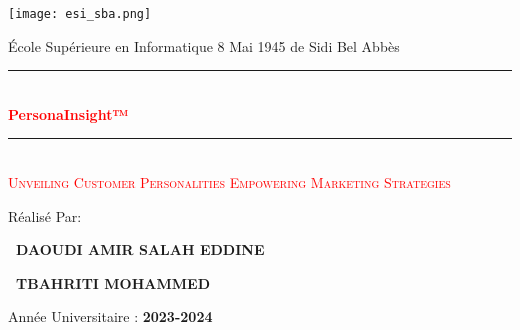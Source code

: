 \documentclass[12pt,a4paper]{report}
\begin{document}
\begin{titlepage}
\vspace{-5cm } 
\begin{center}

{\texttt{[image: esi\_sba.png]}}
\end{center}
\begin{center}


\vspace{1cm}
\medskip
{\Large{École Supérieure en Informatique 8 Mai 1945 de Sidi Bel Abbès}}\\
 \vskip3cm
 \noindent {\textsc{\LARGE \textcolor{blue}{ STUDY OF CLUSTERING ALGORITHMS BY \vskip0.5cm   
ANALYSING CUSTOMERS PERSONALITY }}\\[2cm]}
\end{center}
\vskip0.5cm
\begin{center}
\vskip0.5cm
\newcommand{\HRule}{\rule{\linewidth}{0.5mm}} 
    \HRule\\[0.2cm]
        {\huge\bfseries\textcolor{red}{PersonaInsight™ 
\\[0.2cm]}}
    \HRule\\[1cm]
  \textsc{\LARGE \textcolor{red}{Unveiling Customer Personalities 
  \vskip0.2cm
  Empowering Marketing Strategies}}\\
\end{center}
\vskip0.8cm
  \centerline{ Réalisé Par:}
  \centerline {\small \bf{\ DAOUDI AMIR SALAH EDDINE }}
  \centerline {\small \bf{\ TBAHRITI MOHAMMED}}
  
  \vspace{5mm}
  \vskip1cm
 
 
 
  
  
   
  
 

\vskip3cm
\begin{center}
{\small{Année Universitaire : \textbf{2023-2024}}} \\
\end{center}

\end{titlepage}


\dominitoc
\newpage
 \hypersetup{linkcolor=black} 
   \tableofcontents %
 

   
   
\newpage
\end{document}

